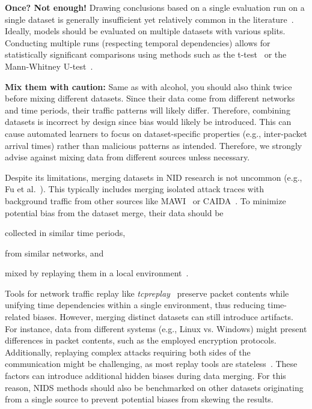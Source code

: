 \textbf{Once? Not enough!} Drawing conclusions based on a single evaluation run on a single dataset is generally insufficient yet relatively common in the literature~\cite{apruzzese2023_sok_pragmatic}. Ideally, models should be evaluated on multiple datasets with various splits. Conducting multiple runs (respecting temporal dependencies) allows for statistically significant comparisons using methods such as the t-test~\cite{student1908_probable_error_of_a_mean} or the Mann-Whitney U-test~\cite{mann1947_u_test}.

\textbf{Mix them with caution:} Same as with alcohol, you should also think twice before mixing different datasets. Since their data come from different networks and time periods, their traffic patterns will likely differ. Therefore, combining datasets is incorrect by design since bias would likely be introduced. This can cause automated learners to focus on dataset-specific properties (e.g., inter-packet arrival times) rather than malicious patterns as intended. Therefore, we strongly advise against mixing data from different sources unless necessary.

Despite its limitations, merging datasets in NID research is not uncommon (e.g., Fu et al.~\cite{fu2021_realtime_malicious_traffic_detection}). This typically includes merging isolated attack traces with background traffic from other sources like MAWI~\cite{mawi2024_mawi_wg_traffic_archive} or CAIDA~\cite{caida_anonymized_traces}. To minimize potential bias from the dataset merge, their data should be
\begin{enumerate*}[label=\alph*), topsep=0pt]
    \item collected in similar time periods,
    \item from similar networks, and
    \item mixed by replaying them in a local environment~\cite{adeleke2022_network_traffic_generation_survey}.
\end{enumerate*}


Tools for network traffic replay like \emph{tcpreplay}~\cite{tcpreplay} preserve packet contents while unifying time dependencies within a single environment, thus reducing time-related biases. However, merging distinct datasets can still introduce artifacts. For instance, data from different systems (e.g., Linux vs. Windows) might present differences in packet contents, such as the employed encryption protocols. Additionally, replaying complex attacks requiring both sides of the communication might be challenging, as most replay tools are stateless~\cite{adeleke2022_network_traffic_generation_survey}. These factors can introduce additional hidden biases during data merging. For this reason, NIDS methods should also be benchmarked on other datasets originating from a single source to prevent potential biases from skewing the results.

